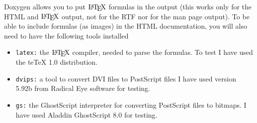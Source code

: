 Doxygen allows you to put $\mbox{\LaTeX}$ formulas in the output (this works only for the HTML and $\mbox{\LaTeX}$ output, not for the RTF nor for the man page output). To be able to include formulas (as images) in the HTML documentation, you will also need to have the following tools installed \begin{itemize}
\item {\tt latex:} the $\mbox{\LaTeX}$ compiler, needed to parse the formulas. To test I have used the teTeX 1.0 distribution. \item {\tt dvips:} a tool to convert DVI files to PostScript files I have used version 5.92b from Radical Eye software for testing. \item {\tt gs:} the GhostScript interpreter for converting PostScript files to bitmaps. I have used Aladdin GhostScript 8.0 for testing. \end{itemize}



